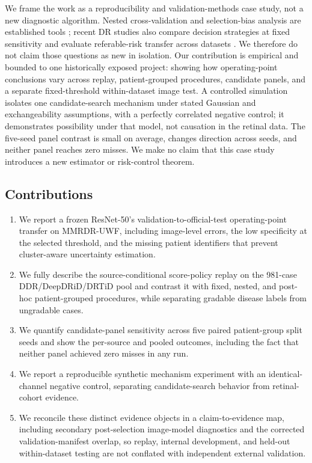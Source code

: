 \documentclass[11pt]{article}
\begin{document}
We frame the work as a reproducibility and validation-methods case study, not a new diagnostic algorithm. Nested cross-validation and selection-bias analysis are established tools \cite{cawley2010,varma2006}; recent DR studies also compare decision strategies at fixed sensitivity and evaluate referable-risk transfer across datasets \cite{jena2026,sheng2026orderdr}. We therefore do not claim those questions as new in isolation. Our contribution is empirical and bounded to one historically exposed project: showing how operating-point conclusions vary across replay, patient-grouped procedures, candidate panels, and a separate fixed-threshold within-dataset image test. A controlled simulation isolates one candidate-search mechanism under stated Gaussian and exchangeability assumptions, with a perfectly correlated negative control; it demonstrates possibility under that model, not causation in the retinal data. The five-seed panel contrast is small on average, changes direction across seeds, and neither panel reaches zero misses. We make no claim that this case study introduces a new estimator or risk-control theorem.

\subsection{Contributions}
\begin{enumerate}
\item We report a frozen ResNet-50's validation-to-official-test operating-point transfer on MMRDR-UWF, including image-level errors, the low specificity at the selected threshold, and the missing patient identifiers that prevent cluster-aware uncertainty estimation.
\item We fully describe the source-conditional score-policy replay on the 981-case DDR/DeepDRiD/DRTiD pool and contrast it with fixed, nested, and post-hoc patient-grouped procedures, while separating gradable disease labels from ungradable cases.
\item We quantify candidate-panel sensitivity across five paired patient-group split seeds and show the per-source and pooled outcomes, including the fact that neither panel achieved zero misses in any run.
\item We report a reproducible synthetic mechanism experiment with an identical-channel negative control, separating candidate-search behavior from retinal-cohort evidence.
\item We reconcile these distinct evidence objects in a claim-to-evidence map, including secondary post-selection image-model diagnostics and the corrected validation-manifest overlap, so replay, internal development, and held-out within-dataset testing are not conflated with independent external validation.
\end{enumerate}
\end{document}
